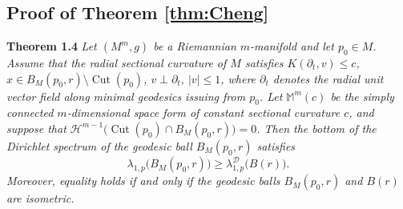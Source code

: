 \documentclass{article}
\begin{document}
\subsection{Proof of Theorem \ref{thm:Cheng}}
\noindent \textbf{Theorem 1.4}
\textit{ Let $(M^m,g)$ be a Riemannian $m$-manifold and let $p_0\in M$. Assume that the radial sectional curvature of $M$ satisfies $K(\partial_t,v) \leq c$, $x\in B_M(p_0,r)\setminus \operatorname{Cut}(p_0)$, $v\perp \partial_t,\ |v|\leq1$, where $\partial_t$ denotes the radial unit vector field along minimal geodesics issuing from $p_0$. Let $\mathbb M^m(c)$ be the simply connected $m$-dimensional space form of constant sectional curvature $c$, and suppose that $\mathcal{H}^{m-1}\big(\operatorname{Cut}(p_0)\cap B_M(p_0,r)\big)=0$. Then the bottom of the Dirichlet spectrum of the geodesic ball $B_M(p_0,r)$ satisfies
\begin{equation}
\lambda_{1,p}\big(B_M(p_0,r)\big) \geq \lambda_{1,p}^{\mathcal{D}}\big(B(r)\big).    \end{equation}\label{comparison}
Moreover, equality holds if and only if the geodesic balls
$B_M(p_0,r)$ and $B(r)$ are isometric.}
\end{document}
